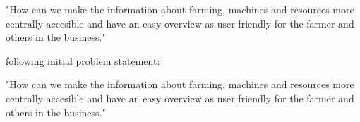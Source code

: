 













"How can we make the information about farming, machines and resources more centrally accesible and have an easy overview as user friendly for the farmer and others in the business."

following initial problem statement:\newline

\begin{center}
"How can we make the information about farming, machines and resources more centrally accesible and have an easy overview as user friendly for the farmer and others in the business."
\end{center}